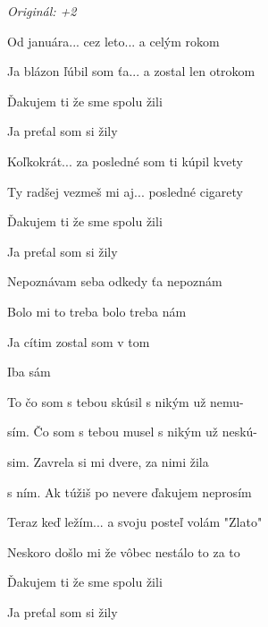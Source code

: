 \begin{song}


 \quad
\textit{Originál: +2}

\large


\Large

\bigskip


 Od januára... cez leto... a celým rokom \par
{} Ja blázon ľúbil som ťa... a zostal len otrokom \par
{}Ďakujem ti že sme spolu žili \par
Ja preťal som si žily \par

\bigskip

 Koľkokrát... za posledné som ti kúpil kvety \par
{} Ty radšej vezmeš mi aj... posledné cigarety \par
{}Ďakujem ti že sme spolu žili \par
Ja preťal som si žily \par

\bigskip

\begin{chorusbox}{\PrechorusAndChorus}
Nepoznávam seba odkedy ťa nepoznám \par
{} Bolo mi to treba  bolo treba nám \par
{} Ja cítim zostal som v tom \par
Iba sám \par

\bigskip

 To čo som s tebou skúsil  s nikým už nemu- \par
{}sím. Čo som s tebou musel  s nikým už neskú- \par
{}sim. Zavrela si mi dvere,  za nimi žila \par
{}s ním. Ak túžiš po nevere  ďakujem neprosím \par
\end{chorusbox}

\bigskip

 Teraz keď ležím... a svoju posteľ volám "Zlato" \par
{} Neskoro došlo mi že vôbec nestálo to za to \par
{}Ďakujem ti že sme spolu žili \par
Ja preťal som si žily \par

\bigskip

\PrechorusAndChorus \par
{}


\end{song}